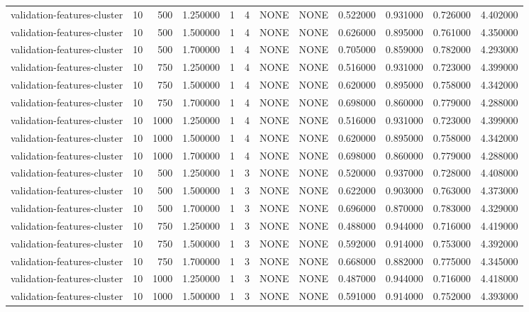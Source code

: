 \begin{tabular}{lrrrllllrrrr}
validation-features-cluster & 10 & 500 & 1.250000 & 1 & 4 & NONE & NONE & 0.522000 & 0.931000 & 0.726000 & 4.402000 \\
validation-features-cluster & 10 & 500 & 1.500000 & 1 & 4 & NONE & NONE & 0.626000 & 0.895000 & 0.761000 & 4.350000 \\
validation-features-cluster & 10 & 500 & 1.700000 & 1 & 4 & NONE & NONE & 0.705000 & 0.859000 & 0.782000 & 4.293000 \\
validation-features-cluster & 10 & 750 & 1.250000 & 1 & 4 & NONE & NONE & 0.516000 & 0.931000 & 0.723000 & 4.399000 \\
validation-features-cluster & 10 & 750 & 1.500000 & 1 & 4 & NONE & NONE & 0.620000 & 0.895000 & 0.758000 & 4.342000 \\
validation-features-cluster & 10 & 750 & 1.700000 & 1 & 4 & NONE & NONE & 0.698000 & 0.860000 & 0.779000 & 4.288000 \\
validation-features-cluster & 10 & 1000 & 1.250000 & 1 & 4 & NONE & NONE & 0.516000 & 0.931000 & 0.723000 & 4.399000 \\
validation-features-cluster & 10 & 1000 & 1.500000 & 1 & 4 & NONE & NONE & 0.620000 & 0.895000 & 0.758000 & 4.342000 \\
validation-features-cluster & 10 & 1000 & 1.700000 & 1 & 4 & NONE & NONE & 0.698000 & 0.860000 & 0.779000 & 4.288000 \\
validation-features-cluster & 10 & 500 & 1.250000 & 1 & 3 & NONE & NONE & 0.520000 & 0.937000 & 0.728000 & 4.408000 \\
validation-features-cluster & 10 & 500 & 1.500000 & 1 & 3 & NONE & NONE & 0.622000 & 0.903000 & 0.763000 & 4.373000 \\
validation-features-cluster & 10 & 500 & 1.700000 & 1 & 3 & NONE & NONE & 0.696000 & 0.870000 & 0.783000 & 4.329000 \\
validation-features-cluster & 10 & 750 & 1.250000 & 1 & 3 & NONE & NONE & 0.488000 & 0.944000 & 0.716000 & 4.419000 \\
validation-features-cluster & 10 & 750 & 1.500000 & 1 & 3 & NONE & NONE & 0.592000 & 0.914000 & 0.753000 & 4.392000 \\
validation-features-cluster & 10 & 750 & 1.700000 & 1 & 3 & NONE & NONE & 0.668000 & 0.882000 & 0.775000 & 4.345000 \\
validation-features-cluster & 10 & 1000 & 1.250000 & 1 & 3 & NONE & NONE & 0.487000 & 0.944000 & 0.716000 & 4.418000 \\
validation-features-cluster & 10 & 1000 & 1.500000 & 1 & 3 & NONE & NONE & 0.591000 & 0.914000 & 0.752000 & 4.393000 \\

\end{tabular}
